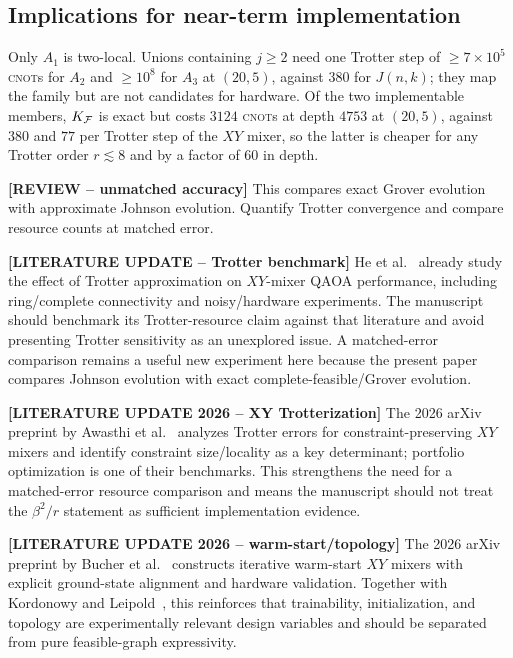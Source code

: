 \subsection{\label{sec:nisq}Implications for near-term implementation}
Only $A_1$ is two-local. Unions containing $j\ge2$ need one Trotter step
of $\ge7\times10^{5}$ \textsc{cnot}s for $A_2$ and $\ge10^{8}$ for $A_3$
at $(20,5)$, against $380$ for $J(n,k)$; they map the family but are not
candidates for hardware. Of the two implementable members, $K_{\mathcal{F}}$ is
exact but costs $3124$ \textsc{cnot}s at depth $4753$ at $(20,5)$,
against $380$ and $77$ per Trotter step of the $XY$ mixer, so the latter
is cheaper for any Trotter order $r\lesssim8$ and by a factor of $60$ in
depth.

{\color{red}\textbf{[REVIEW -- unmatched accuracy]} This compares exact Grover evolution with approximate Johnson evolution. Quantify Trotter convergence and compare resource counts at matched error.}

{\color{red}\textbf{[LITERATURE UPDATE -- Trotter benchmark]} He et al.~\cite{He2023} already study the effect of Trotter approximation on $XY$-mixer QAOA performance, including ring/complete connectivity and noisy/hardware experiments. The manuscript should benchmark its Trotter-resource claim against that literature and avoid presenting Trotter sensitivity as an unexplored issue. A matched-error comparison remains a useful new experiment here because the present paper compares Johnson evolution with exact complete-feasible/Grover evolution.}

{\color{red}\textbf{[LITERATURE UPDATE 2026 -- XY Trotterization]} The 2026 arXiv preprint by Awasthi et al.~\cite{Awasthi2026Trotter} analyzes Trotter errors for constraint-preserving $XY$ mixers and identify constraint size/locality as a key determinant; portfolio optimization is one of their benchmarks. This strengthens the need for a matched-error resource comparison and means the manuscript should not treat the $\beta^2/r$ statement as sufficient implementation evidence.}

{\color{red}\textbf{[LITERATURE UPDATE 2026 -- warm-start/topology]} The 2026 arXiv preprint by Bucher et al.~\cite{Bucher2026WarmStart} constructs iterative warm-start $XY$ mixers with explicit ground-state alignment and hardware validation. Together with Kordonowy and Leipold~\cite{Kordonowy2026}, this reinforces that trainability, initialization, and topology are experimentally relevant design variables and should be separated from pure feasible-graph expressivity.}

